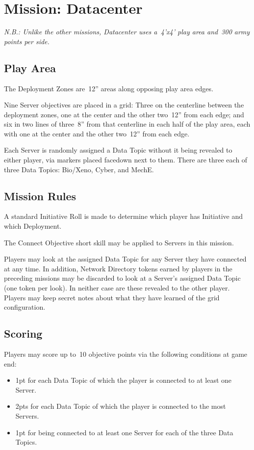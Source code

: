 \chapter{Mission: Datacenter}

\emph{N.B.: Unlike the other missions, \emph{Datacenter} uses a~4'x4'
  play area and~300 army points per side.}

\section{Play Area}

The Deployment Zones are~12'' areas along opposing play area edges.

Nine Server objectives are placed in a grid: Three on the centerline
between the deployment zones, one at the center and the other two~12''
from each edge; and six in two lines of three~8'' from that centerline
in each half of the play area, each with one at the center and the
other two~12'' from each edge.

Each Server is randomly assigned a Data Topic without it being
revealed to either player, via markers placed facedown next to them.
There are three each of three Data Topics: Bio/Xeno, Cyber, and MechE.

\section{Mission Rules}

A standard Initiative Roll is made to determine which player has
Initiative and which Deployment.


The Connect Objective short skill may be applied to Servers in this
mission.

Players may look at the assigned Data Topic for any Server they have
connected at any time.  In addition, Network Directory tokens earned
by players in the preceding missions may be discarded to look at a
Server's assigned Data Topic (one token per look).  In neither case
are these revealed to the other player.  Players may keep secret notes
about what they have learned of the grid configuration.


\section{Scoring}

Players may score up to~10 objective points via the following
conditions at game end:
\begin{itemize}\shortlist
\item   1pt for each Data Topic of which the player is connected to at least one Server.
\item 2pts for each Data Topic of which the player is connected to the most Servers.
\item   1pt for being connected to at least one Server for each of the three Data Topics.
\end{itemize}
